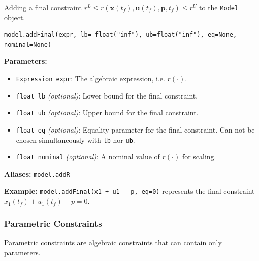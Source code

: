 \documentclass[12pt]{article}
\renewcommand{\v}{\bm}
\begin{document}
\begin{mdframed}[backgroundcolor=gray!10, roundcorner=10pt,
		linewidth=1pt]

	Adding a final constraint ${r}^{L} \leq {r}(\v{x}(t_f),
		\v{u}(t_f), \v{p}, t_f) \leq {r}^{U}$ to the \texttt{Model}
	object.

	\begin{lstlisting}
model.addFinal(expr, lb=-float("inf"), ub=float("inf"), eq=None, nominal=None)
		\end{lstlisting}
	\label{addFinal}
	\textbf{Parameters:}
	\begin{itemize}
		\item \texttt{Expression expr}: The algebraic
		      expression, i.e. $r(\cdot)$.
		\item \texttt{float lb} \emph{(optional)}: Lower bound
		      for the final constraint.
		\item \texttt{float ub} \emph{(optional)}: Upper bound
		      for the final constraint.
		\item \texttt{float eq} \emph{(optional)}: Equality
		      parameter for the final constraint. Can not be chosen
		      simultaneously with
		      \texttt{lb} nor \texttt{ub}.
		\item \texttt{float nominal} \emph{(optional)}: A
		      nominal value of $r(\cdot)$ for scaling.
	\end{itemize}

	\textbf{Aliases:}  \texttt{model.addR}

	\textbf{Example:} \texttt{model.addFinal(x1 + u1 - p, eq=0)}
	represents the final constraint
	$x_1(t_f) + u_1(t_f) - p = 0$.
\end{mdframed}

\subsubsection{Parametric Constraints}

Parametric constraints are algebraic constraints that can
contain only parameters.
\end{document}
